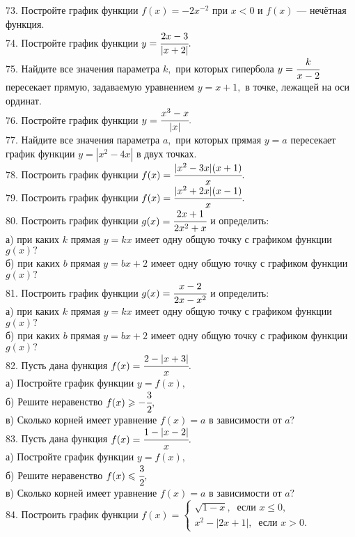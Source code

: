 73. Постройте график функции $f(x)=-2x^{-2}$ при $x<0$ и $f(x)$ --- нечётная функция.\\
74. Постройте график функции $y=\cfrac{2x-3}{|x+2|}.$\\
75. Найдите все значения параметра $k,$ при которых гипербола $y=\cfrac{k}{x-2}$ пересекает прямую, задаваемую уравнением $y=x+1,$ в точке, лежащей на оси ординат.\\
76. Постройте график функции $y=\cfrac{x^3-x}{|x|}.$\\
77. Найдите все значения параметра $a,$ при которых прямая $y=a$ пересекает график функции $y=|x^2-4x|$ в двух точках.\\
78. Построить график функции $f(x)=\cfrac{|x^2-3x|(x+1)}{x}.$\\
79. Построить график функции $f(x)=\cfrac{|x^2+2x|(x-1)}{x}.$\\
80. Построить график функции $g(x)=\cfrac{2x+1}{2x^2+x}$ и определить:\\
а) при каких $k$ прямая $y=kx$ имеет одну общую точку с графиком функции $g(x)?$\\
б) при каких $b$ прямая $y=bx+2$ имеет одну общую точку с графиком функции $g(x)?$\\
81. Построить график функции $g(x)=\cfrac{x-2}{2x-x^2}$ и определить:\\
а) при каких $k$ прямая $y=kx$ имеет одну общую точку с графиком функции $g(x)?$\\
б) при каких $b$ прямая $y=bx+2$ имеет одну общую точку с графиком функции $g(x)?$\\
82. Пусть дана функция $f(x)=\cfrac{2-|x+3|}{x}.$\\
а) Постройте график функции $y=f(x),$\\
б) Решите неравенство $f(x)\geqslant-\cfrac{3}{2},$\\
в) Сколько корней имеет уравнение $f(x)=a$ в зависимости от $a?$\\
83. Пусть дана функция $f(x)=\cfrac{1-|x-2|}{x}.$\\
а) Постройте график функции $y=f(x),$\\
б) Решите неравенство $f(x)\leqslant\cfrac{3}{2},$\\
в) Сколько корней имеет уравнение $f(x)=a$ в зависимости от $a?$\\
84. Построить график функции $f(x)=\begin{cases} \sqrt{1-x},\ \text{ если } x\leqslant0,\\
x^2-|2x+1|,\ \text{ если } x>0.\end{cases}$\\
